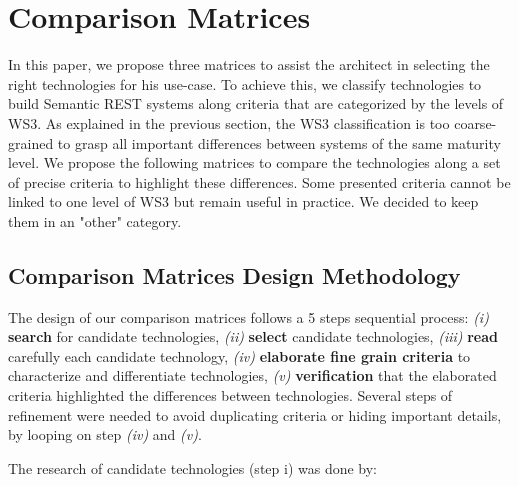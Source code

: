 \section{Comparison Matrices}\label{sec:matrix}

\vspace*{-0.2cm}


In this paper, we propose three matrices to assist the architect in selecting the right technologies for his use-case. To achieve this, we classify technologies to build Semantic REST systems along criteria that are categorized by the levels of WS3. As explained in the previous section, the WS3 classification is too coarse-grained to grasp all important differences between systems of the same maturity level. We propose the following matrices to compare the technologies along a set of precise criteria to highlight these differences. Some presented criteria cannot be linked to one level of WS3 but remain useful in practice. We decided to keep them in an "other" category.

\subsection{Comparison Matrices Design Methodology}


The design of our comparison matrices follows a 5 steps sequential process: \textit{(i)} \textbf{search} for candidate technologies, \textit{(ii)} \textbf{select} candidate technologies, \textit{(iii)} \textbf{read} carefully each candidate technology, \textit{(iv)} \textbf{elaborate fine grain criteria} to characterize and differentiate technologies, \textit{(v)} \textbf{verification} that the elaborated criteria highlighted the differences between technologies. Several steps of refinement were needed to avoid duplicating criteria or hiding important details, by looping on step \textit{(iv)} and \textit{(v)}.

The research of candidate technologies (step i) was done by:

